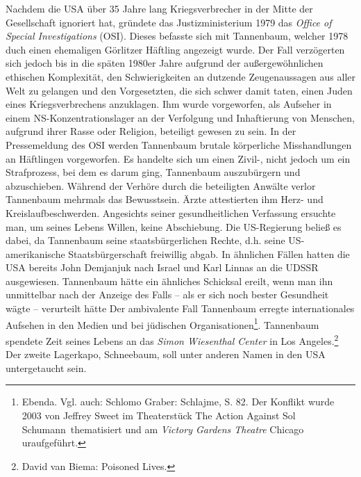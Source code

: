 Nachdem die USA über 35 Jahre lang Kriegsverbrecher in der Mitte der Gesellschaft ignoriert hat, gründete das Justizministerium 1979 das \emph{Office of Special Investigations} (OSI). Dieses befasste sich mit Tannenbaum, welcher 1978 duch einen ehemaligen Görlitzer Häftling angezeigt wurde. Der Fall verzögerten sich jedoch bis in die späten 1980er Jahre aufgrund der außergewöhnlichen ethischen Komplexität, den Schwierigkeiten an dutzende Zeugenaussagen aus aller Welt zu gelangen und den Vorgesetzten, die sich schwer damit taten, einen Juden eines Kriegsverbrechens anzuklagen. Ihm wurde vorgeworfen, als Aufseher in einem NS-Konzentrationslager an der Verfolgung und Inhaftierung von Menschen, aufgrund ihrer Rasse oder Religion, beteiligt gewesen zu sein. In der Pressemeldung des OSI werden Tannenbaum brutale körperliche Misshandlungen an Häftlingen vorgeworfen. Es handelte sich um einen Zivil-, nicht jedoch um ein Strafprozess, bei dem es darum ging, Tannenbaum auszubürgern und abzuschieben. Während der Verhöre durch die beteiligten Anwälte verlor Tannenbaum mehrmals das Bewusstsein. Ärzte attestierten ihm Herz- und Kreislaufbeschwerden. Angesichts seiner gesundheitlichen Verfassung ersuchte man, um seines Lebens Willen, keine Abschiebung. Die US-Regierung beließ es dabei, da Tannenbaum seine staatsbürgerlichen Rechte, d.h. seine US-amerikanische Staatsbürgerschaft freiwillig abgab. In ähnlichen Fällen hatten die USA bereits John Demjanjuk nach Israel und Karl Linnas an die UDSSR ausgewiesen. Tannenbaum hätte ein ähnliches Schicksal ereilt, wenn man ihn unmittelbar nach der Anzeige des Falls -- als er sich noch bester Gesundheit wägte --  verurteilt hätte
Der ambivalente Fall Tannenbaum erregte internationales Aufsehen in den Medien und bei jüdischen Organisationen\footnote{Ebenda. Vgl. auch: Schlomo Graber: Schlajme, S. 82. Der Konflikt wurde 2003 von Jeffrey Sweet im Theaterstück \glqq The Action Against Sol Schumann\grqq~thematisiert und am \emph{Victory Gardens Theatre} Chicago uraufgeführt.}. Tannenbaum spendete Zeit seines Lebens an das \emph{Simon Wiesenthal Center} in Los Angeles.\footnote{﻿David van Biema: Poisoned Lives.} 
~\newline
Der zweite Lagerkapo, Schneebaum, soll unter anderen Namen in den USA untergetaucht sein.


